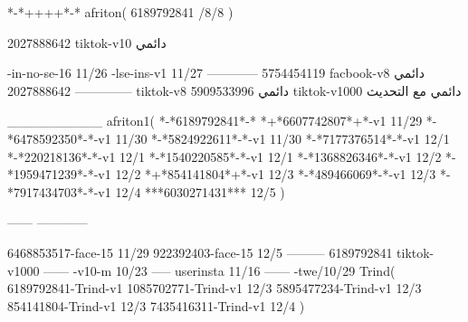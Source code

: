 *-*++++*-*
afriton(
6189792841 /8/8
)

2027888642 tiktok-v10
دائمي

-in-no-se-16 11/26
-lse-ins-v1 11/27
------------
5754454119 facbook-v8
دائمي
--------------
2027888642 tiktok-v8
دائمي
5909533996 tiktok-v1000
دائمي مع التحديث

__________
afriton1(
*-*6189792841*-*
*+*6607742807*+*-v1 11/29
*-*6478592350*-*-v1 11/30
*-*5824922611*-*-v1 11/30
*-*7177376514*-*-v1 12/1
*-*220218136*-*-v1 12/1
*-*1540220585*-*-v1 12/1
*-*1368826346*-*-v1 12/2
*-*1959471239*-*-v1 12/2
*+*854141804*+*-v1 12/3
*-*489466069*-*-v1 12/3
*-*7917434703*-*-v1 12/4
***6030271431*** 12/5
)

------
------------

6468853517-face-15 11/29
922392403-face-15 12/5
---------
6189792841 tiktok-v1000
------
-v10-m 10/23
-----
userinsta 11/16
------
-twe/10/29
Trind(
6189792841-Trind-v1 
1085702771-Trind-v1 12/3
5895477234-Trind-v1 12/3
854141804-Trind-v1 12/3
7435416311-Trind-v1 12/4
)
